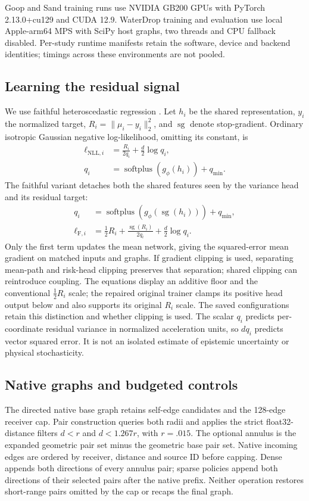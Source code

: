 Goop and Sand training runs use NVIDIA GB200 GPUs with PyTorch 2.13.0+cu129 and CUDA 12.9. WaterDrop training and evaluation use local Apple-arm64 MPS with SciPy host graphs, two threads and CPU fallback disabled. Per-study runtime manifests retain the software, device and backend identities; timings across these environments are not pooled.

\subsection{Learning the residual signal}
We use faithful heteroscedastic regression \citep{stirn2023}. Let $h_i$ be the shared representation, $y_i$ the normalized target, $R_i=\|\mu_i-y_i\|_2^2$, and $\operatorname{sg}$ denote stop-gradient. Ordinary isotropic Gaussian negative log-likelihood, omitting its constant, is
\begin{align}
 \ell_{\mathrm{NLL},i}&=\frac{R_i}{2q_i}+\frac d2\log q_i,\nonumber\\
 q_i&=\operatorname{softplus}(g_\phi(h_i))+q_{\min}.
 \label{eq:nll}
\end{align}
The faithful variant detaches both the shared features seen by the variance head and its residual target:
\begin{align}
 q_i&=\operatorname{softplus}(g_\phi(\operatorname{sg}(h_i)))+q_{\min},\nonumber\\
 \ell_{\mathrm F,i}&=\tfrac12R_i+
 \frac{\operatorname{sg}(R_i)}{2q_i}+\frac d2\log q_i.
 \label{eq:faithful}
\end{align}
Only the first term updates the mean network, giving the squared-error mean gradient on matched inputs and graphs. If gradient clipping is used, separating mean-path and risk-head clipping preserves that separation; shared clipping can reintroduce coupling. The equations display an additive floor and the conventional $\tfrac12R_i$ scale; the repaired original trainer clamps its positive head output below and also supports its original $R_i$ scale. The saved configurations retain this distinction and whether clipping is used. The scalar $q_i$ predicts per-coordinate residual variance in normalized acceleration units, so $dq_i$ predicts vector squared error. It is not an isolated estimate of epistemic uncertainty or physical stochasticity.

\subsection{Native graphs and budgeted controls}
The directed native base graph retains self-edge candidates and the 128-edge receiver cap. Pair construction queries both radii and applies the strict float32-distance filters $d<r$ and $d<1.267r$, with $r=.015$. The optional annulus is the expanded geometric pair set minus the geometric base pair set. Native incoming edges are ordered by receiver, distance and source ID before capping. Dense appends both directions of every annulus pair; sparse policies append both directions of their selected pairs after the native prefix. Neither operation restores short-range pairs omitted by the cap or recaps the final graph.

